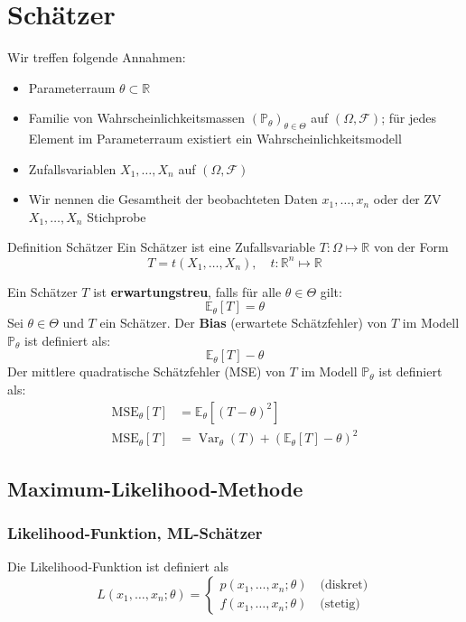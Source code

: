 \documentclass[a4paper,10pt]{article}
\def\R{\mathbb{R}}
\def\P{\mathbb{P}}
\def\F{\mathcal{F}}
\def\E{\mathbb{E}}
\DeclareMathOperator{\Var}{\text{Var}}
\begin{document}
\section{Schätzer}
Wir treffen folgende Annahmen:
\begin{itemize}
	\item Parameterraum \(\theta \subset \R\)
	\item Familie von Wahrscheinlichkeitsmassen \((\P_\theta)_{\theta \in \Theta}\) auf \((\Omega, \F)\); für jedes Element im Parameterraum existiert ein Wahrscheinlichkeitsmodell
	\item Zufallsvariablen \(X_1, \ldots, X_n\) auf \((\Omega, \F)\)
	\item Wir nennen die Gesamtheit der beobachteten Daten \(x_1, \ldots, x_n\) oder der ZV \(X_1, \ldots, X_n\) Stichprobe
\end{itemize}
\begin{mainbox}{Definition Schätzer}
	Ein Schätzer ist eine Zufallsvariable \(T: \Omega \mapsto \R\) von der Form
	\[T = t(X_1, \ldots, X_n), \quad t: \R^n \mapsto \R\]
\end{mainbox}
Ein Schätzer \(T\) ist \textbf{erwartungstreu}, falls für alle \(\theta \in \Theta\) gilt:
\[\E_\theta [T] = \theta\]
Sei \(\theta \in \Theta\) und \(T\) ein Schätzer. Der \textbf{Bias} (erwartete Schätzfehler) von \(T\) im Modell \(\P_\theta\) ist definiert als:
\[\E_\theta[T]-\theta\]
Der mittlere quadratische Schätzfehler (MSE) von \(T\) im Modell \(\P_\theta\) ist definiert als:
\begin{align*}
	\text{MSE}_\theta[T] & = \E_\theta[(T-\theta)^2]                    \\
	\text{MSE}_\theta[T] & = \Var_\theta(T) + (\E_\theta[T] - \theta)^2
\end{align*}

\subsection{Maximum-Likelihood-Methode}
\subsubsection{Likelihood-Funktion, ML-Schätzer}
Die Likelihood-Funktion ist definiert als
\[L(x_1, \ldots, x_n; \theta) = \begin{cases}
	p(x_1, \ldots, x_n; \theta) \quad \text{(diskret)} \\
	f(x_1, \ldots, x_n; \theta) \quad \text{(stetig)}
\end{cases} \]
\end{document}
